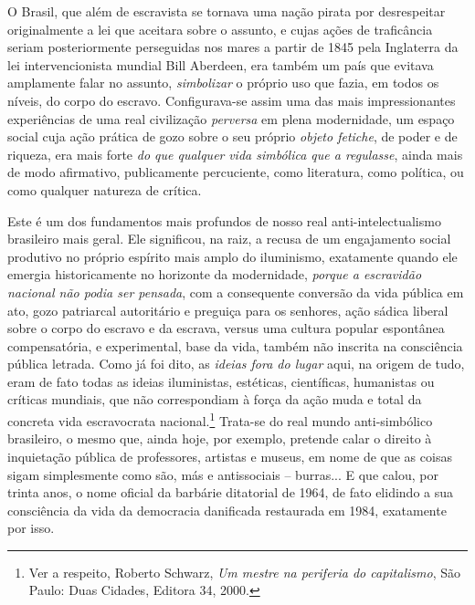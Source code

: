 O Brasil, que além de escravista se tornava uma nação pirata por
desrespeitar originalmente a lei que aceitara sobre o assunto, e cujas
ações de traficância seriam posteriormente perseguidas nos mares a
partir de 1845 pela Inglaterra da lei intervencionista mundial Bill
Aberdeen, era também um país que evitava amplamente falar no assunto,
\emph{simbolizar} o próprio uso que fazia, em todos os níveis, do corpo
do escravo. Configurava-se assim uma das mais impressionantes
experiências de uma real civilização \emph{perversa} em plena
modernidade, um espaço social cuja ação prática de gozo sobre o seu
próprio \emph{objeto fetiche}, de poder e de riqueza, era mais forte
\emph{do que qualquer} \emph{vida simbólica que a regulasse}, ainda mais
de modo afirmativo, publicamente percuciente, como literatura, como
política, ou como qualquer natureza de crítica.

Este é um dos fundamentos mais profundos de nosso real
anti-intelectualismo brasileiro mais geral. Ele significou, na raiz, a
recusa de um engajamento social produtivo no próprio espírito mais amplo
do iluminismo, exatamente quando ele emergia historicamente no horizonte
da modernidade, \emph{porque a escravidão nacional não podia ser
pensada}, com a consequente conversão da vida pública em ato, gozo
patriarcal autoritário e preguiça para os senhores, ação sádica liberal
sobre o corpo do escravo e da escrava, versus uma cultura popular
espontânea compensatória, e experimental, base da vida, também não
inscrita na consciência pública letrada. Como já foi dito, as
\emph{ideias fora do lugar} aqui, na origem de tudo, eram de fato todas
as ideias iluministas, estéticas, científicas, humanistas ou críticas
mundiais, que não correspondiam à força da ação muda e total da concreta
vida escravocrata nacional.\footnote{Ver a respeito, Roberto Schwarz,
  \emph{Um mestre na periferia do capitalismo}, São Paulo: Duas Cidades,
  Editora 34, 2000.} Trata-se do real mundo anti-simbólico brasileiro, o
mesmo que, ainda hoje, por exemplo, pretende calar o direito à
inquietação pública de professores, artistas e museus, em nome de que as
coisas sigam simplesmente como são, más e antissociais -- burras... E
que calou, por trinta anos, o nome oficial da barbárie ditatorial de
1964, de fato elidindo a sua consciência da vida da democracia
danificada restaurada em 1984, exatamente por isso.

